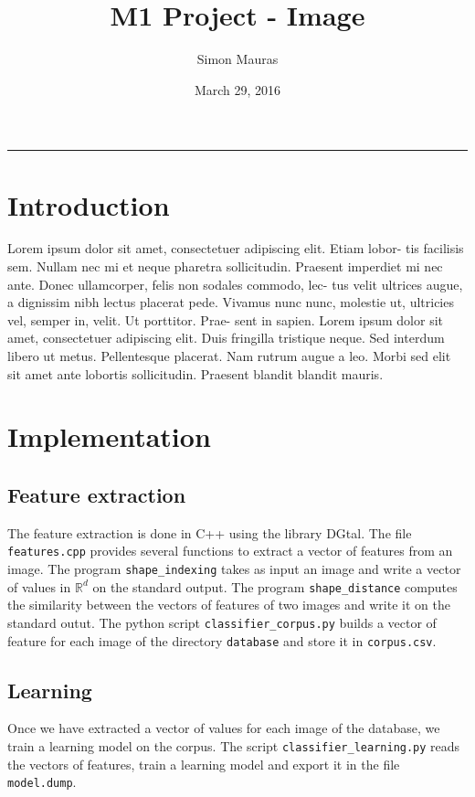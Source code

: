 \documentclass[a4paper, 11pt]{article}
\title{M1 Project - Image}
\author{Simon Mauras}
\date{March 29,  2016}
\begin{document}
\maketitle

\tableofcontents

\vspace{1cm}
\noindent\rule{\textwidth}{0.5px}
\section{Introduction}

Lorem ipsum dolor sit amet, consectetuer adipiscing elit. Etiam lobor-
tis facilisis sem. Nullam nec mi et neque pharetra sollicitudin. Praesent
imperdiet mi nec ante. Donec ullamcorper, felis non sodales commodo, lec-
tus velit ultrices augue, a dignissim nibh lectus placerat pede. Vivamus
nunc nunc, molestie ut, ultricies vel, semper in, velit. Ut porttitor. Prae-
sent in sapien. Lorem ipsum dolor sit amet, consectetuer adipiscing elit.
Duis fringilla tristique neque. Sed interdum libero ut metus. Pellentesque
placerat. Nam rutrum augue a leo. Morbi sed elit sit amet ante lobortis
sollicitudin. Praesent blandit blandit mauris.

\newpage
\section{Implementation}

\subsection{Feature extraction}

The feature extraction is done in C++ using the library DGtal. The file \verb|features.cpp| provides several functions to extract a vector of features from an image. 
The program \verb|shape_indexing| takes as input an image and write a vector of values in $\mathbb R^d$ on the standard output.
The program \verb|shape_distance| computes the similarity between the vectors of features of two images and write it on the standard outut.
The python script \verb|classifier_corpus.py| builds a vector of feature for each image of the directory \verb|database| and store it in \verb|corpus.csv|.

\subsection{Learning}

Once we have extracted a vector of values for each image of the database, we train a learning model on the corpus. The script \verb|classifier_learning.py| reads the vectors of features, train a learning model and export it in the file \verb|model.dump|.
\end{document}
